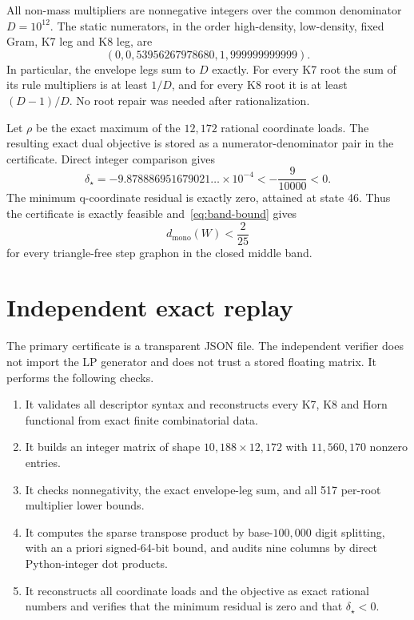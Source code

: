 \documentclass[11pt]{article}
\newcommand{\dmono}{d_{\mathrm{mono}}}
\begin{document}
All non-mass multipliers are nonnegative integers over the common denominator
$D=10^{12}$.  The static numerators, in the order high-density, low-density,
fixed Gram, K7 leg and K8 leg, are
\[
  (0,0,53956267978680,1,999999999999).
\]
In particular, the envelope legs sum to $D$ exactly.  For every K7 root the
sum of its rule multipliers is at least $1/D$, and for every K8 root it is at
least $(D-1)/D$.  No root repair was needed after rationalization.

Let $\rho$ be the exact maximum of the $12{,}172$ rational coordinate loads.
The resulting exact dual objective is stored as a numerator-denominator pair
in the certificate.  Direct integer comparison gives
\begin{equation}\label{eq:negative}
 \delta_\star
 =-9.878886951679021\ldots\times10^{-4}
 <-\frac{9}{10000}<0.
\end{equation}
The minimum q-coordinate residual is exactly zero, attained at state 46.
Thus the certificate is exactly feasible and~\eqref{eq:band-bound} gives
\begin{equation}\label{eq:strict-band}
  \dmono(W)<\frac{2}{25}
\end{equation}
for every triangle-free step graphon in the closed middle band.

\section{Independent exact replay}

The primary certificate is a transparent JSON file.  The independent verifier
does not import the LP generator and does not trust a stored floating matrix.
It performs the following checks.

\begin{enumerate}
\item It validates all descriptor syntax and reconstructs every K7, K8 and
Horn functional from exact finite combinatorial data.
\item It builds an integer matrix of shape $10{,}188\times12{,}172$ with
$11{,}560{,}170$ nonzero entries.
\item It checks nonnegativity, the exact envelope-leg sum, and all 517
per-root multiplier lower bounds.
\item It computes the sparse transpose product by base-$100{,}000$ digit
splitting, with an a priori signed-64-bit bound, and audits nine columns by
direct Python-integer dot products.
\item It reconstructs all coordinate loads and the objective as exact
rational numbers and verifies that the minimum residual is zero and that
$\delta_\star<0$.
\end{enumerate}
\end{document}
